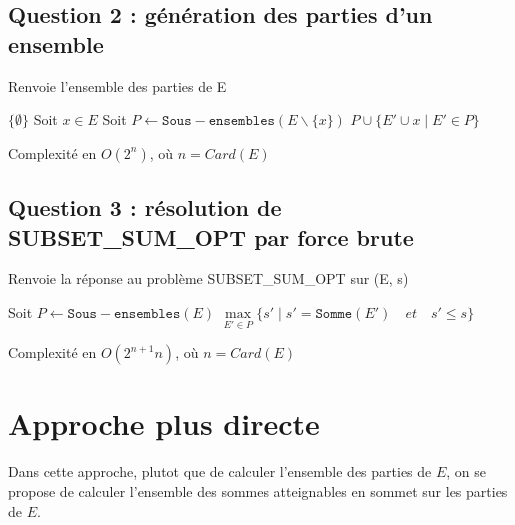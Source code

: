 \documentclass[10pt]{article}
\let\oldReturn\Return
\renewcommand{\Return}{\State\oldReturn}
\begin{document}
		\subsection{Question 2 : génération des parties d'un ensemble}
			\begin{algorithm}
				\caption{Renvoie l'ensemble des parties de E}
				\begin{algorithmic}[1]
							\Return $\{\emptyset\}$
						\EndIf
						\State Soit $x \in E$
						\State Soit $P \leftarrow \mathtt{Sous-ensembles}(E \backslash \{x\})$
						\Return $P \cup \{E' \cup x \mid E' \in P\}$
					\EndFunction
				\end{algorithmic}
			\end{algorithm}
			Complexité en $\boxed{O(2^n)}$, où $n = Card(E)$
		
		\subsection{Question 3 : résolution de SUBSET\_SUM\_OPT par force brute}
			\begin{algorithm}
				\caption{Renvoie la réponse au problème SUBSET\_SUM\_OPT sur (E, s)}
				\begin{algorithmic}[1]
					\Function{subset\_sum}{$E \subset \mathbb{N}, s \in \mathbb{N}$}
						\State Soit $P \leftarrow \mathtt{Sous-ensembles}(E)$
						\Return $\underset{E' \in P}{\max}\{s' \mid s' = \mathtt{Somme}(E') \quad et \quad s' \leq s\}$
					\EndFunction
				\end{algorithmic}
			\end{algorithm}
			Complexité en $\boxed{O(2^{n+1}n)}$, où $n = Card(E)$
			
	\newpage
	\section{Approche plus directe}\label{approche_plus_directe}
		Dans cette approche, plutot que de calculer l'ensemble des parties de $E$,
		on se propose de calculer l'ensemble des sommes atteignables en sommet sur les parties de $E$.
		
\end{document}
